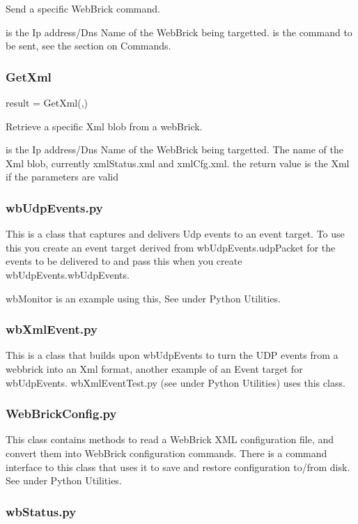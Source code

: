 Send a specific WebBrick command.

     is the Ip address/Dns Name of the WebBrick being targetted.
     is the command to be sent, see the section on Commands.

\subsubsection{GetXml}
result = GetXml(,)

Retrieve a specific Xml blob from a webBrick.

     is the Ip address/Dns Name of the WebBrick being targetted.
     The name of the Xml blob, currently xmlStatus.xml and xmlCfg.xml.
     the return value is the Xml if the parameters are valid

\subsubsection{wbUdpEvents.py}
This is a class that captures and delivers Udp events to an event target. To use this you create an event
target derived from wbUdpEvents.udpPacket for the events to be delivered to and pass this when you create 
wbUdpEvents.wbUdpEvents. 

wbMonitor is an example using this, See under Python Utilities.

\subsubsection{wbXmlEvent.py}

This is a class that builds upon wbUdpEvents to turn the UDP events from a webbrick into an Xml format, another example of an
Event target for wbUdpEvents.  wbXmlEventTest.py (see under Python Utilities) uses this class.

\subsubsection{WebBrickConfig.py}

This class contains methods to read a WebBrick XML configuration file, and convert them into WebBrick configuration commands.
There is a command interface to this class that uses it to save and restore configuration to/from disk. 
See under Python Utilities.

\subsubsection{wbStatus.py}


